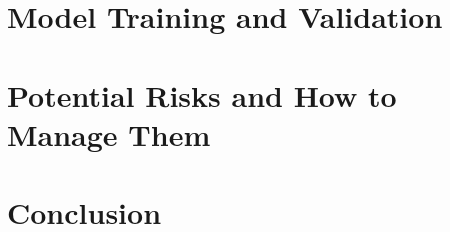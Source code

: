 \documentclass{article}
\begin{document}
\section{Model Training and Validation}




\section{Potential Risks and How to Manage Them}



\section{Conclusion}



\end{document}
